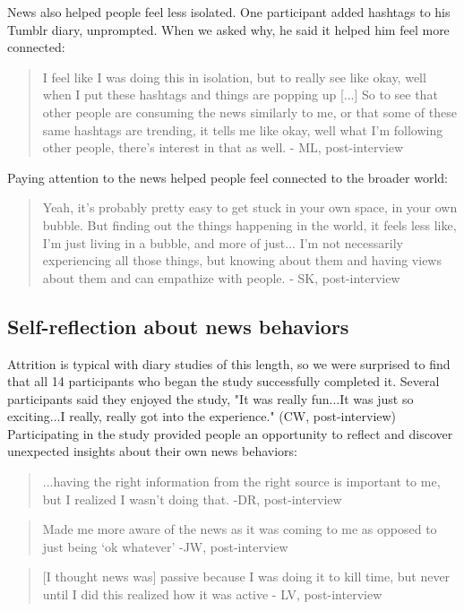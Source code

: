 \documentclass[sigchi]{acmart}
\begin{document}
News also helped people feel less isolated. One participant added hashtags to his Tumblr diary, unprompted. When we asked why, he said it helped him feel more connected: 
\begin{quote}
I feel like I was doing this in isolation, but to really see like okay, well when I put these hashtags and things are popping up [...] So to see that other people are consuming the news similarly to me, or that some of these same hashtags are trending, it tells me like okay, well what I'm following other people, there's interest in that as well. - ML, post-interview
\end{quote}
Paying attention to the news helped people feel connected to the broader world:
\begin{quote}
Yeah, it's probably pretty easy to get stuck in your own space, in your own bubble. But finding out the things happening in the world, it feels less like, I'm just living in a bubble, and more of just... I'm not necessarily experiencing all those things, but knowing about them and having views about them and can empathize with people. - SK, post-interview
\end{quote}

\subsection{Self-reflection about news behaviors}
Attrition is typical with diary studies of this length, so we were surprised to find that all 14 participants who began the study successfully completed it. Several participants said they enjoyed the study, "It was really fun...It was just so exciting...I really, really got into the experience." (CW, post-interview) Participating in the study provided people an opportunity to reflect and discover unexpected insights about their own news behaviors:
\begin{quote}
...having the right information from the right source is important to me, but I realized I wasn’t doing that. -DR, post-interview\end{quote}
\begin{quote}
Made me more aware of the news as it was coming to me as opposed to just being ‘ok whatever’ -JW, post-interview\end{quote}
\begin{quote}
[I thought news was] passive because I was doing it to kill time, but never until I did this realized how it was active - LV, post-interview\end{quote}
\end{document}
